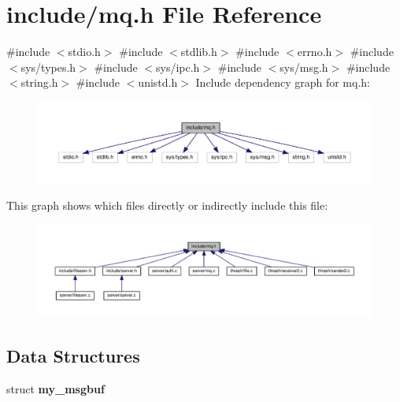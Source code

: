 \section{include/mq.h File Reference}
\label{mq_8h}
{\ttfamily \#include $<$stdio.\+h$>$}\newline
{\ttfamily \#include $<$stdlib.\+h$>$}\newline
{\ttfamily \#include $<$errno.\+h$>$}\newline
{\ttfamily \#include $<$sys/types.\+h$>$}\newline
{\ttfamily \#include $<$sys/ipc.\+h$>$}\newline
{\ttfamily \#include $<$sys/msg.\+h$>$}\newline
{\ttfamily \#include $<$string.\+h$>$}\newline
{\ttfamily \#include $<$unistd.\+h$>$}\newline
Include dependency graph for mq.\+h\+:\nopagebreak
\begin{figure}[H]
\begin{center}
\leavevmode
\includegraphics[width=350pt]{mq_8h__incl}
\end{center}
\end{figure}
This graph shows which files directly or indirectly include this file\+:\nopagebreak
\begin{figure}[H]
\begin{center}
\leavevmode
\includegraphics[width=350pt]{mq_8h__dep__incl}
\end{center}
\end{figure}
\subsection*{Data Structures}
\begin{DoxyCompactItemize}
\item 
struct \textbf{ my\+\_\+msgbuf}
\end{DoxyCompactItemize}
